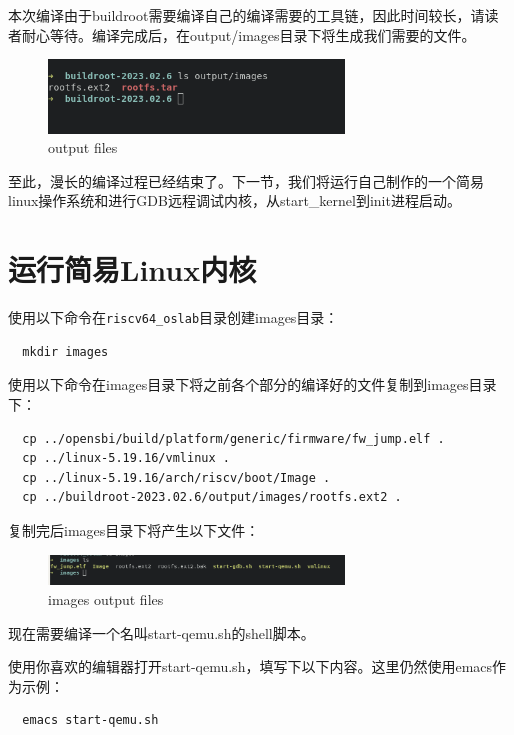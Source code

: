 \documentclass[lang=cn,10pt]{elegantbook}
\begin{document}
本次编译由于buildroot需要编译自己的编译需要的工具链，因此时间较长，请读者耐心等待。编译完成后，在output/images目录下将生成我们需要的文件。

\begin{figure}[htbp]
  \centering
  \includegraphics[width=0.7\textwidth]{image/image-20231105101948270.png}
  \caption{output files}
\end{figure}

至此，漫长的编译过程已经结束了。下一节，我们将运行自己制作的一个简易linux操作系统和进行GDB远程调试内核，从start\_kernel到init进程启动。

\section{运行简易Linux内核}
使用以下命令在\lstinline{riscv64_oslab}目录创建images目录：

\begin{lstlisting}
  mkdir images
\end{lstlisting}

使用以下命令在images目录下将之前各个部分的编译好的文件复制到images目录下：

\begin{lstlisting}
  cp ../opensbi/build/platform/generic/firmware/fw_jump.elf .
  cp ../linux-5.19.16/vmlinux .
  cp ../linux-5.19.16/arch/riscv/boot/Image .
  cp ../buildroot-2023.02.6/output/images/rootfs.ext2 .
\end{lstlisting}

复制完后images目录下将产生以下文件：


\begin{figure}[htbp]
  \centering
  \includegraphics[width=0.7\textwidth]{image/image-20231105102806931.png}
  \caption{images output files}
\end{figure}

现在需要编译一个名叫start-qemu.sh的shell脚本。

使用你喜欢的编辑器打开start-qemu.sh，填写下以下内容。这里仍然使用emacs作为示例：

\begin{lstlisting}
  emacs start-qemu.sh
\end{lstlisting}
\end{document}
